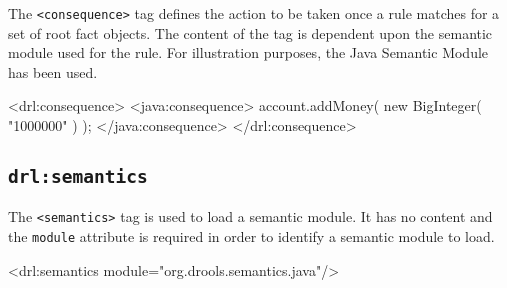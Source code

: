The \verb|<consequence>| tag defines the action to be taken
once a rule matches for a set of root fact objects.  The content
of the tag is dependent upon the semantic module used for the rule.
For illustration purposes, the Java Semantic Module has been used.

\begin{codelisting}
<drl:consequence>
\textcolor{light}{  <java:consequence>
    account.addMoney( new BigInteger( "1000000" ) );
  </java:consequence>}
</drl:consequence>
\end{codelisting}


\subsection{\texttt{drl:semantics}}

The \verb|<semantics>| tag is used to load a semantic module.
It has no content and the \verb|module| attribute is required
in order to identify a semantic module to load.

\begin{codelisting}
<drl:semantics module="org.drools.semantics.java"/>
\end{codelisting}
